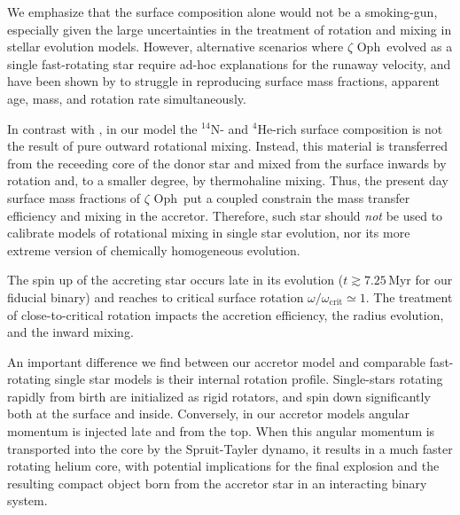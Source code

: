 \documentclass[twocolumn,twocolappendix,trackchanges]{aastex63}
\newcommand{\zoph}{$\zeta$ Oph}
\begin{document}
We emphasize that the surface composition alone would not be a smoking-gun,
especially given the large uncertainties in the treatment of rotation
and mixing in stellar evolution models. However, alternative scenarios where \zoph\
evolved as a single fast-rotating star require ad-hoc explanations for the runaway velocity,
and have been shown by \citetalias{villamariz:05} to struggle in reproducing
surface mass fractions, apparent age, mass, and rotation rate simultaneously.

In contrast with \cite{vanrensbergen:96}, in our model the
$^{14}\mathrm{N}$- and $^4\mathrm{He}$-rich surface composition is not
the result of pure outward rotational mixing.  Instead, this material
is transferred from the receeding core of the donor star and mixed
from the surface inwards by rotation and, to a smaller degree, by
thermohaline mixing.  Thus, the present day surface mass fractions of
\zoph\ put a coupled constrain the mass transfer efficiency and mixing
in the accretor. Therefore, such star should \emph{not} be used to
calibrate models of rotational mixing in single star evolution, nor
its more extreme version of chemically homogeneous evolution.

The spin up of the accreting star occurs late in its evolution
($t\gtrsim7.25$\,Myr for our fiducial binary) and
reaches to critical surface rotation
$\omega/\omega_\mathrm{crit}\simeq 1$. %
The treatment of close-to-critical rotation
impacts the accretion efficiency, the radius evolution, and the inward
mixing.

An important difference we find between our accretor model and
comparable fast-rotating single star models is their internal rotation
profile. Single-stars rotating rapidly from birth are initialized as
rigid rotators, and spin down significantly both at the surface and
inside. Conversely, in our accretor models angular momentum is
injected late and from the top. When this angular momentum is
transported into the core by the Spruit-Tayler dynamo, it results in a
much faster rotating helium core, with potential implications for the
final explosion and the resulting compact object born from the
accretor star in an interacting binary system. %
\end{document}
